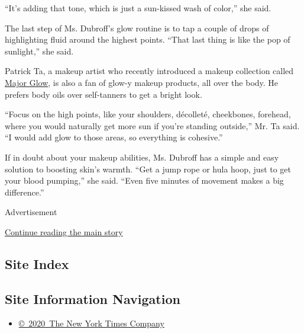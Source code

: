 ``It's adding that tone, which is just a sun-kissed wash of color,'' she
said.

The last step of Ms. Dubroff's glow routine is to tap a couple of drops
of highlighting fluid around the highest points. ``That last thing is
like the pop of sunlight,'' she said.

Patrick Ta, a makeup artist who recently introduced a makeup collection
called \href{https://patrickta.com/}{Major Glow}, is also a fan of
glow-y makeup products, all over the body. He prefers body oils over
self-tanners to get a bright look.

``Focus on the high points, like your shoulders, décolleté, cheekbones,
forehead, where you would naturally get more sun if you're standing
outside,'' Mr. Ta said. ``I would add glow to those areas, so everything
is cohesive.''

If in doubt about your makeup abilities, Ms. Dubroff has a simple and
easy solution to boosting skin's warmth. ``Get a jump rope or hula hoop,
just to get your blood pumping,'' she said. ``Even five minutes of
movement makes a big difference.''

Advertisement

\protect\hyperlink{after-bottom}{Continue reading the main story}

\hypertarget{site-index}{%
\subsection{Site Index}\label{site-index}}

\hypertarget{site-information-navigation}{%
\subsection{Site Information
Navigation}\label{site-information-navigation}}

\begin{itemize}
\tightlist
\item
  \href{https://help.nytimes3xbfgragh.onion/hc/en-us/articles/115014792127-Copyright-notice}{©~2020~The
  New York Times Company}
\end{itemize}


